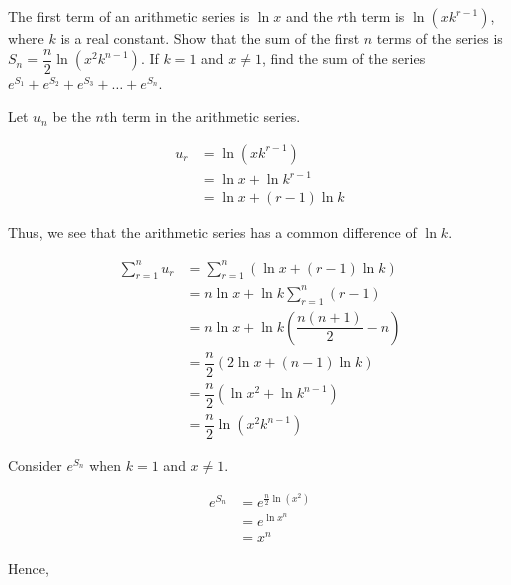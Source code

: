\documentclass{jhwhw}
\begin{document}
    \problem{}
        The first term of an arithmetic series is $\ln x$ and the $r$th term is $\ln (xk^{r-1})$, where $k$ is a real constant. Show that the sum of the first $n$ terms of the series is $S_n = \dfrac{n}2 \ln (x^2k^{n-1})$. If $k = 1$ and $x \neq 1$, find the sum of the series $e^{S_1} + e^{S_2} + e^{S_3} + \ldots + e^{S_n}$.

    \solution
        Let $u_n$ be the $n$th term in the arithmetic series.

        \begin{equation*}
            \begin{aligned}
                u_r &= \ln (xk^{r-1})\\
                &= \ln x + \ln k^{r-1}\\
                &= \ln x + (r-1)\ln k
            \end{aligned}
        \end{equation*}

        Thus, we see that the arithmetic series has a common difference of $\ln k$.
        
        \begin{equation*}
            \begin{aligned}
                \sum_{r=1}^n u_r &= \sum_{r=1}^n (\ln x + (r-1)\ln k) \\
                &= n\ln x + \ln k \sum_{r=1}^n (r-1)\\
                &= n\ln x + \ln k \left(\dfrac{n(n+1)}2 - n \right)\\
                &= \dfrac{n}2 (2\ln x  +(n-1)\ln k)\\
                &= \dfrac{n}2 (\ln x^2 + \ln k^{n-1})\\
                &= \dfrac{n}2 \ln (x^2k^{n-1})
            \end{aligned}
        \end{equation*}

        Consider $e^{S_n}$ when $k = 1$ and $x \neq 1$.

        \begin{equation*}
            \begin{aligned}
                e^{S_n} &= e^{\tfrac{n}2 \ln (x^2)}\\
                &= e^{\ln{x^n}}\\
                &= x^n
            \end{aligned}
        \end{equation*}

        Hence,
\end{document}
